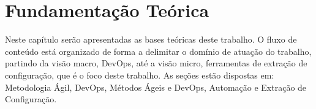 \newpage\null\thispagestyle{empty}\newpage
\chapter{Fundamentação Teórica}
\label{chap:teoria}

Neste capítulo serão apresentadas as bases teóricas deste trabalho.
O fluxo de conteúdo está organizado de forma a delimitar o domínio de atuação
do trabalho, partindo da visão macro, DevOps, até a visão micro, ferramentas de
extração de configuração, que é o foco deste trabalho. As seções estão dispostas em:
Metodologia Ágil, DevOps, Métodos Ágeis e DevOps, Automação e Extração de Configuração.






